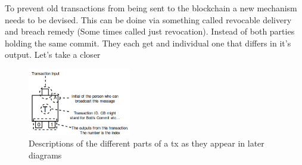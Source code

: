 To prevent old transactions from being sent to the blockchain a new mechanism needs to be devised. This can be doine via something called revocable delivery and breach remedy (Some times called just revocation).
Instead of both parties holding the same commit. They each get and individual one that differs in it's output. Let's take a closer

  
\begin{figure}
	\begin{center}
		\includegraphics[width=0.4\textwidth]{background/images/tx_anatomy.png}
	\end{center}
	\vspace{-8mm}
	\caption{Descriptions of the different parts of a tx as they appear in later diagrams}
	\label{fig:script}
\end{figure}
